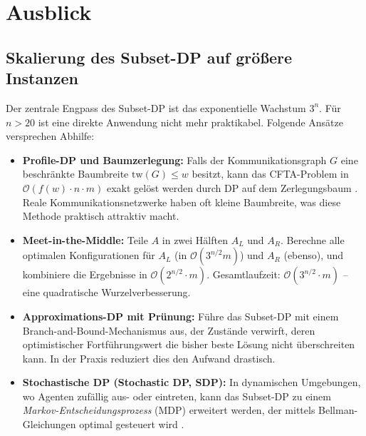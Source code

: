 \documentclass[a4paper,12pt]{article}
\theoremstyle{definition}
\begin{document}
\section{Ausblick}

\subsection{Skalierung des Subset-DP auf gr\"{o}{\ss}ere Instanzen}

Der zentrale Engpass des Subset-DP ist das exponentielle Wachstum $3^n$.
F\"{u}r $n > 20$ ist eine direkte Anwendung nicht mehr praktikabel.
Folgende Ans\"{a}tze versprechen Abhilfe:

\begin{itemize}
    \item \textbf{Profile-DP und Baumzerlegung:} Falls der Kommunikationsgraph $G$
          eine beschr\"{a}nkte Baumbreite $\mathrm{tw}(G) \leq w$ besitzt, kann das
          CFTA-Problem in $\mathcal{O}(f(w) \cdot n \cdot m)$ exakt gel\"{o}st werden
          durch DP auf dem Zerlegungsbaum \cite{cygan2015}. Reale Kommunikationsnetzwerke
          haben oft kleine Baumbreite, was diese Methode praktisch attraktiv macht.
    \item \textbf{Meet-in-the-Middle:} Teile $A$ in zwei H\"{a}lften $A_L$ und $A_R$.
          Berechne alle optimalen Konfigurationen f\"{u}r $A_L$ (in $\mathcal{O}(3^{n/2} m)$)
          und $A_R$ (ebenso), und kombiniere die Ergebnisse in $\mathcal{O}(2^{n/2} \cdot m)$.
          Gesamtlaufzeit: $\mathcal{O}(3^{n/2} \cdot m)$ -- eine quadratische
          Wurzelverbesserung.
    \item \textbf{Approximations-DP mit Pr\"{u}nung:} F\"{u}hre das Subset-DP
          mit einem Branch-and-Bound-Mechanismus aus, der Zust\"{a}nde verwirft,
          deren optimistischer Fortf\"{u}hrungswert die bisher beste L\"{o}sung
          nicht \"{u}berschreiten kann. In der Praxis reduziert dies den Aufwand
          drastisch.
    \item \textbf{Stochastische DP (Stochastic DP, SDP):} In dynamischen
          Umgebungen, wo Agenten zuf\"{a}llig aus- oder eintreten, kann das
          Subset-DP zu einem \emph{Markov-Entscheidungsprozess} (MDP) erweitert
          werden, der mittels Bellman-Gleichungen optimal gesteuert wird \cite{sutton2018}.
\end{itemize}
\end{document}
